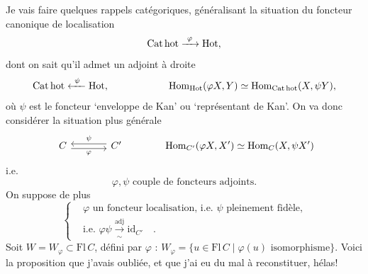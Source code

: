 Je vais faire quelques rappels catégoriques, généralisant la situation du foncteur canonique de localisation
\[
\Cathot\xrightarrow{\ \varphi\ }\mathrm{Hot},
\]
dont on sait qu'il admet un adjoint à droite
\[
\mathrm{Cat\,hot}\xleftarrow{\ \psi\ }\mathrm{Hot}, \qquad\qquad\qquad \mathrm{Hom}_{\mathrm{Hot}}(\varphi X,Y)\simeq\mathrm{Hom}_{\mathrm{Cat\,hot}}(X,\psi Y),
\]
où $\psi$ est le foncteur ‘enveloppe de Kan’ ou ‘représentant de Kan’. On va donc considérer la situation plus générale
\[
\begin{tikzcd}[column sep=large]
C \arrow[r, shift right=1, "\varphi"'] & C' \arrow[l, shift right=1, "\psi"']
\end{tikzcd}
\qquad\qquad \mathrm{Hom}_{C'}(\varphi X,X')\simeq\mathrm{Hom}_{C}(X,\psi X')
\]
i.e.
\[
\varphi,\psi \text{ couple de foncteurs adjoints.}
\]
On suppose de plus
\[
\left\{
\begin{aligned}
&\varphi \text{ un foncteur localisation, i.e. } \psi \text{ pleinement fidèle,}\\
&\text{i.e. } \varphi\psi\xrightarrow[\sim]{\text{adj}}\mathrm{id}_{C'} \quad .
\end{aligned}
\right.
\]
Soit $W=W_{\varphi}\subset\mathrm{Fl}\,C$, défini par $\varphi$ : $W_{\varphi}=\{u\in\mathrm{Fl}\,C\mid\varphi(u)\text{ isomorphisme}\}$. Voici la proposition que j'avais oubliée, et que j'ai eu du mal à reconstituer, hélas!


